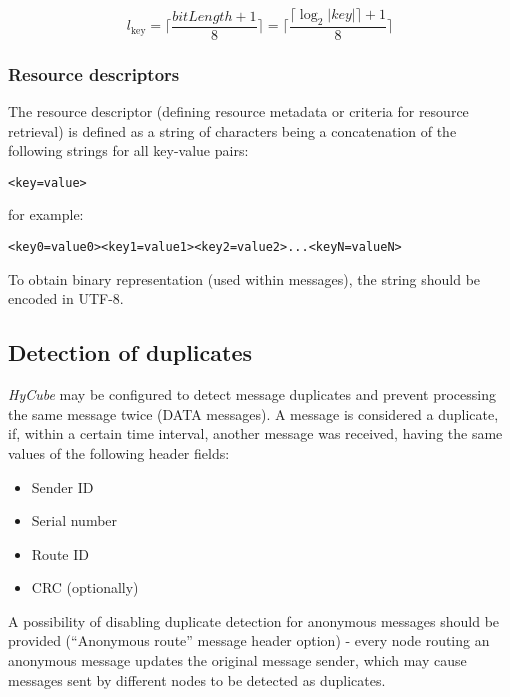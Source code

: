 $$
l_{\text{key}} = \biggl\lceil \frac{bitLength + 1}{8} \biggr\rceil = \Biggl\lceil \frac{\bigl\lceil \log_2{|key|} \bigr\rceil + 1}{8} \Biggr\rceil
$$
 





\subsubsection{Resource descriptors}

The resource descriptor (defining resource metadata or criteria for resource retrieval) is defined as a string of characters being a concatenation of the following strings for all key-value pairs:

\begin{lstlisting}[style=listing1noindent]
<key=value>
\end{lstlisting}

\noindent
for example:

\begin{lstlisting}[style=listing1noindent]
<key0=value0><key1=value1><key2=value2>...<keyN=valueN>
\end{lstlisting}

\noindent
To obtain binary representation (used within messages), the string should be encoded in UTF-8.






\subsection{Detection of duplicates}

\emph{HyCube} may be configured to detect message duplicates and prevent processing the same message twice (DATA messages). A message is considered a duplicate, if, within a certain time interval, another message was received, having the same values of the following header fields:

\begin{itemize}
	\renewcommand{\labelitemi}{$\bullet$}
	\item Sender ID
	\item Serial number
	\item Route ID
	\item CRC (optionally)
\end{itemize}

A possibility of disabling duplicate detection for anonymous messages should be provided (``Anonymous route'' message header option) - every node routing an anonymous message updates the original message sender, which may cause messages sent by different nodes to be detected as duplicates.




